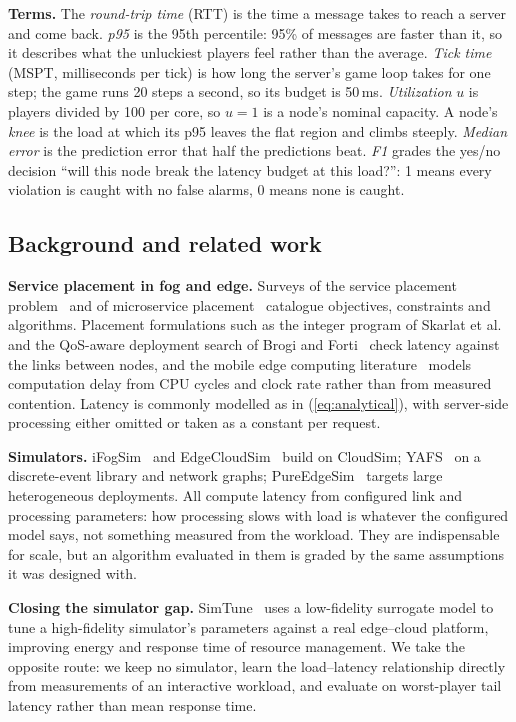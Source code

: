\documentclass[conference]{IEEEtran}
\begin{document}
\textbf{Terms.} The \emph{round-trip time} (RTT) is the time a message takes
to reach a server and come back. \emph{p95} is the 95th percentile: 95\% of
messages are faster than it, so it describes what the unluckiest players feel
rather than the average. \emph{Tick time} (MSPT, milliseconds per tick) is
how long the server's game loop takes for one step; the game runs 20 steps a
second, so its budget is 50\,ms. \emph{Utilization} $u$ is players divided
by 100 per core, so $u=1$ is a node's nominal capacity. A node's \emph{knee}
is the load at which its p95 leaves the flat region and climbs steeply.
\emph{Median error} is the prediction error that half the predictions beat.
\emph{F1} grades the yes/no decision ``will this node break the latency
budget at this load?'': 1 means every violation is caught with no false
alarms, 0 means none is caught.

\subsection{Background and related work}

\textbf{Service placement in fog and edge.} Surveys of the service placement
problem~\cite{aitsalaht2019overview} and of microservice
placement~\cite{pallewatta2023taxonomy} catalogue objectives, constraints and
algorithms. Placement formulations such as the integer program of Skarlat
et al.~\cite{skarlat2017placement} and the QoS-aware deployment search of
Brogi and Forti~\cite{brogi2017fog} check latency against the links between
nodes, and the mobile edge computing literature~\cite{mao2017mec} models
computation delay from CPU cycles and clock rate rather than from measured
contention. Latency is commonly modelled as in (\ref{eq:analytical}), with
server-side processing either omitted or taken as a constant per request.

\textbf{Simulators.} iFogSim~\cite{gupta2017ifogsim} and
EdgeCloudSim~\cite{sonmez2018edgecloudsim} build on CloudSim;
YAFS~\cite{lera2019yafs} on a discrete-event library and network graphs;
PureEdgeSim~\cite{mechalikh2021pureedgesim} targets large heterogeneous
deployments. All compute latency from configured link and processing
parameters: how processing slows with load is whatever the configured model
says, not something measured from the workload. They are indispensable for scale, but an algorithm evaluated in
them is graded by the same assumptions it was designed with.

\textbf{Closing the simulator gap.} SimTune~\cite{tuli2022simtune} uses a
low-fidelity surrogate model to tune a high-fidelity simulator's parameters
against a real edge--cloud platform, improving energy and response time of
resource management. We take the opposite route: we keep no simulator, learn
the load--latency relationship directly from measurements of an interactive
workload, and evaluate on worst-player tail latency rather than mean
response time.
\end{document}
